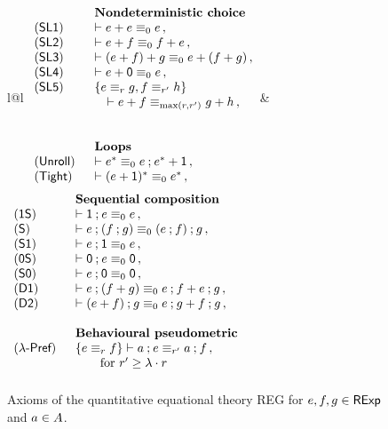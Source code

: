 \begin{figure}[h]
	
{
\small
\begin{tabular}{l@{\quad}l}
\(
\begin{array}{ll}
&\textbf{Nondeterministic choice}\\
(\mathsf{SL1})\;\; 
& \vdash e + e \equiv_0 e \,, \\
(\mathsf{SL2})\;\; 
& \vdash e + f \equiv_0 f + e \,, \\
(\mathsf{SL3})\;\; 
& \vdash (e + f) + g\equiv_0 e + (f + g) \,, \\
(\mathsf{SL4})\;\; 
& \vdash e + \mathsf{0}\equiv_0 e \,, \\
(\mathsf{SL5})\;\; & \{ e \equiv_r g , f \equiv_{r'} h\} \\ & \quad\vdash e + f \equiv_{\max(r, r')} g + h \,, \\\\\\
&\textbf{Loops} \\
(\mathsf{Unroll})\;\; & \vdash e^\ast \equiv_0 e \mathbin{;} e^{\ast} + \mathsf{1} \,, \\
(\mathsf{Tight})\;\; & \vdash (e + \mathsf{1})^\ast \equiv_0 e^\ast \,, \\[1.2ex]
\end{array}
\)&
\(
\begin{array}{ll}
&\textbf{Sequential composition}\\
	(\mathsf{1S})\;\; 
& \vdash \mathsf{1} \mathbin{;} e \equiv_0 e \,, \\
(\mathsf{S})\;\; 
& \vdash e \mathbin{;} (f \mathbin{;} g) \equiv_0 (e \mathbin{;} f) \mathbin{;} g \,, \\
(\mathsf{S1})\;\; 
& \vdash e \mathbin{;} \mathsf{1} \equiv_0 e \,, \\
(\mathsf{0S})\;\; 
& \vdash \mathsf{0} \mathbin{;} e \equiv_0 \mathsf{0} \,, \\
(\mathsf{S0})\;\; 
& \vdash e \mathbin{;} \mathsf{0} \equiv_0 \mathsf{0} \,, \\
(\mathsf{D1})\;\; 
& \vdash e \mathbin{;} (f + g) \equiv_0 e \mathbin{;} f + e \mathbin{;} g \,, \\
(\mathsf{D2})\;\; 
& \vdash (e + f) \mathbin{;} g \equiv_0 e \mathbin{;} g + f \mathbin{;} g \,, \\\\
&\textbf{Behavioural pseudometric}\\
(\textsf{$\lambda$-Pref})\;\; & \{ e \equiv_r f \} \vdash a \mathbin{;} e \equiv_{r'} a \mathbin{;} f \,,\\&\qquad \text{for $r'\geq \lambda \cdot r$} \\[1.2ex]
\end{array}
\)
\end{tabular}
}	
\caption{Axioms of the quantitative equational theory \textsf{REG} for $e,f,g \in \mathsf{RExp}$ and $a \in {A}$.}
\label{c2:fig:axioms}
\end{figure}

